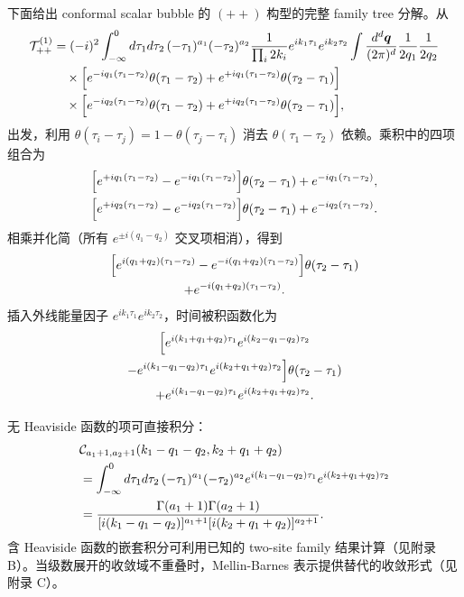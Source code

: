 ﻿\documentclass[a4paper,11pt]{article}
\begin{document}
下面给出 conformal scalar bubble 的 $(++)$ 构型的完整 family tree 分解。从
\begin{align}
    \mathcal{T}^{(1)}_{++}&=(-i)^2\int_{-\infty}^0d\tau_1d\tau_2\,(-\tau_1)^{a_1}(-\tau_2)^{a_2}
    \frac{1}{\prod_i 2k_i}e^{ik_1\tau_1}e^{ik_2\tau_2}
    \int\frac{d^d\boldsymbol{q}}{(2\pi)^d}\frac{1}{2q_1}\frac{1}{2q_2}\notag\\
    &\quad\times\Bigl[e^{-i q_1(\tau_1-\tau_2)}\theta(\tau_1-\tau_2)+e^{+i q_1(\tau_1-\tau_2)}\theta(\tau_2-\tau_1)\Bigr]\notag\\
    &\quad\times\Bigl[e^{-i q_2(\tau_1-\tau_2)}\theta(\tau_1-\tau_2)+e^{+i q_2(\tau_1-\tau_2)}\theta(\tau_2-\tau_1)\Bigr],
\end{align}
出发，利用 $\theta(\tau_i-\tau_j)=1-\theta(\tau_j-\tau_i)$ 消去 $\theta(\tau_1-\tau_2)$ 依赖。乘积中的四项组合为
\begin{gather}
    \Bigl[e^{+i q_1(\tau_1-\tau_2)}-e^{-i q_1(\tau_1-\tau_2)}\Bigr]\theta(\tau_2-\tau_1)+e^{-i q_1(\tau_1-\tau_2)},\\
    \Bigl[e^{+i q_2(\tau_1-\tau_2)}-e^{-i q_2(\tau_1-\tau_2)}\Bigr]\theta(\tau_2-\tau_1)+e^{-i q_2(\tau_1-\tau_2)}.
\end{gather}
相乘并化简（所有 $e^{\pm i(q_1-q_2)}$ 交叉项相消），得到
\begin{multline}
    \Bigl[
    e^{i(q_1+q_2)(\tau_1-\tau_2)}
    -e^{-i(q_1+q_2)(\tau_1-\tau_2)}
    \Bigr]\theta(\tau_2-\tau_1)\\
    +e^{-i(q_1+q_2)(\tau_1-\tau_2)}.
\end{multline}
插入外线能量因子 $e^{ik_1\tau_1}e^{ik_2\tau_2}$，时间被积函数化为
\begin{multline}
    \Bigl[
    e^{i(k_1+q_1+q_2)\tau_1}
    e^{i(k_2-q_1-q_2)\tau_2}\\
    -e^{i(k_1-q_1-q_2)\tau_1}
    e^{i(k_2+q_1+q_2)\tau_2}
    \Bigr]\theta(\tau_2-\tau_1)\\
    +e^{i(k_1-q_1-q_2)\tau_1}
    e^{i(k_2+q_1+q_2)\tau_2}.
\end{multline}

无 Heaviside 函数的项可直接积分：
\begin{align}
    &\mathcal{C}_{a_1+1,a_2+1}
    (k_1-q_1-q_2,
     k_2+q_1+q_2)
     \notag\\
    &=\int_{-\infty}^0d\tau_1d\tau_2\,(-\tau_1)^{a_1}(-\tau_2)^{a_2}
      e^{i(k_1-q_1-q_2)\tau_1}e^{i(k_2+q_1+q_2)\tau_2}\notag\\
    &=\frac{\Gamma(a_1+1)\Gamma(a_2+1)}
    {[i(k_1-q_1-q_2)]^{a_1+1}
     [i(k_2+q_1+q_2)]^{a_2+1}}.
\end{align}
含 Heaviside 函数的嵌套积分可利用已知的 two-site family 结果计算（见附录 B）。当级数展开的收敛域不重叠时，Mellin-Barnes 表示提供替代的收敛形式（见附录 C）。
\end{document}
